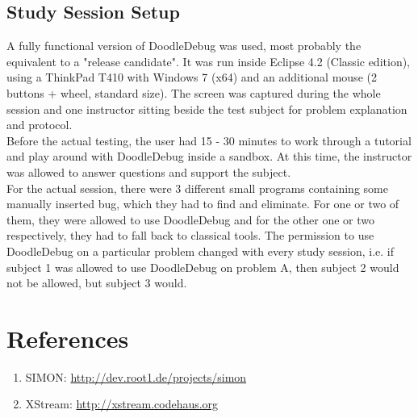 \documentclass{report}
\begin{document}
\section*{Study Session Setup}
A fully functional version of DoodleDebug was used, most probably the equivalent to a "release candidate". It was run inside Eclipse 4.2 (Classic edition), using a ThinkPad T410 with Windows 7 (x64) and an additional mouse (2 buttons + wheel, standard size). The screen was captured during the whole session and one instructor sitting beside the test subject for problem explanation and protocol.\\
Before the actual testing, the user had 15 - 30 minutes to work through a tutorial and play around with DoodleDebug inside a sandbox. At this time, the instructor was allowed to answer questions and support the subject.\\
For the actual session, there were 3 different small programs containing some manually inserted bug, which they had to find and eliminate. For one or two of them, they were allowed to use DoodleDebug and for the other one or two respectively, they had to fall back to classical tools. The permission to use DoodleDebug on a particular problem changed with every study session, i.e. if subject 1 was allowed to use DoodleDebug on problem A, then subject 2 would not be allowed, but subject 3 would.

\chapter*{References}
\begin{enumerate}
\item
SIMON: \url{http://dev.root1.de/projects/simon}
\item
XStream: \url{http://xstream.codehaus.org}
\end{enumerate}
\end{document}
